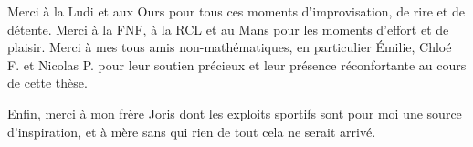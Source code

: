 \medskip

Merci à la Ludi et aux Ours pour tous ces moments d'improvisation, de rire et
de détente. Merci à la FNF, à la RCL et au Mans pour les moments d'effort et
de plaisir. Merci à mes tous amis non-mathématiques, en particulier Émilie,
Chloé F. et Nicolas P. pour leur soutien précieux et leur présence
réconfortante au cours de cette thèse.

Enfin, merci à mon frère Joris dont les exploits sportifs sont pour moi une
source d'inspiration, et à mère sans qui rien de tout cela ne serait arrivé.

\cleardoublepage
\endinput

